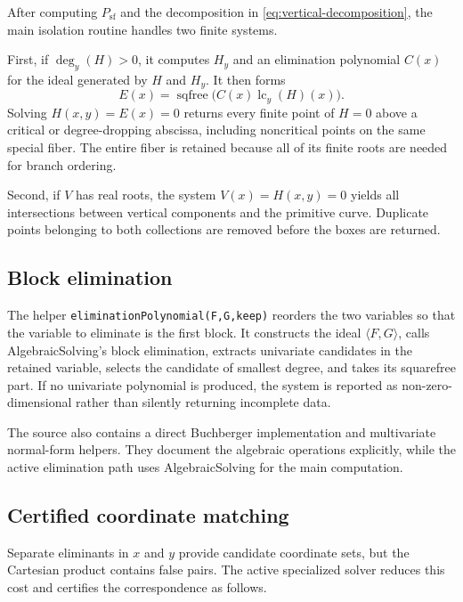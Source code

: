 \documentclass[11pt,a4paper]{article}
\newcommand{\lc}{\operatorname{lc}}
\newcommand{\sqfree}{\operatorname{sqfree}}
\begin{document}
After computing $P_{\mathrm{sf}}$ and the decomposition in
\cref{eq:vertical-decomposition}, the main isolation routine handles two
finite systems.

First, if $\deg_y(H)>0$, it computes $H_y$ and an elimination polynomial
$C(x)$ for the ideal generated by $H$ and $H_y$. It then forms
\[
  E(x)=\sqfree\bigl(C(x)\lc_y(H)(x)\bigr).
\]
Solving $H(x,y)=E(x)=0$ returns every finite point of $H=0$ above a critical
or degree-dropping abscissa, including noncritical points on the same special
fiber. The entire fiber is retained because all of its finite roots are needed
for branch ordering.

Second, if $V$ has real roots, the system $V(x)=H(x,y)=0$ yields all
intersections between vertical components and the primitive curve. Duplicate
points belonging to both collections are removed before the boxes are
returned.

\subsection{Block elimination}

The helper \texttt{eliminationPolynomial(F,G,keep)} reorders the two variables
so that the variable to eliminate is the first block. It constructs the ideal
$\langle F,G\rangle$, calls AlgebraicSolving's block elimination, extracts
univariate candidates in the retained variable, selects the candidate of
smallest degree, and takes its squarefree part. If no univariate polynomial is
produced, the system is reported as non-zero-dimensional rather than silently
returning incomplete data.

The source also contains a direct Buchberger implementation and multivariate
normal-form helpers. They document the algebraic operations explicitly, while
the active elimination path uses AlgebraicSolving for the main computation.

\subsection{Certified coordinate matching}

Separate eliminants in $x$ and $y$ provide candidate coordinate sets, but the
Cartesian product contains false pairs. The active specialized solver reduces
this cost and certifies the correspondence as follows.
\end{document}

